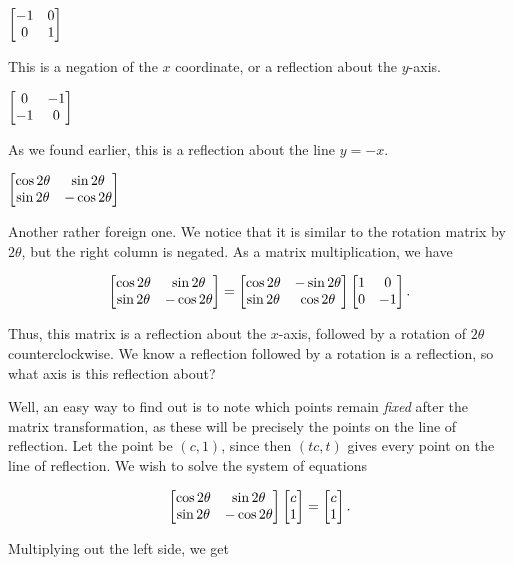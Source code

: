 \documentclass[../gatm_answers.tex]{subfiles}
\begin{document}
\begin{inner_problem}
\item $\begin{bmatrix} -1 & 0 \\ 0 & 1 \end{bmatrix}$ \label{prob:highlighted_example_list_transformations1}
\end{inner_problem}

This is a negation of the $x$ coordinate, or a reflection about the $y$-axis.

\begin{inner_problem}
\item $\begin{bmatrix} 0 & -1 \\ -1 & 0 \end{bmatrix}$ \label{prob:highlighted_example_list_transformations2}
\end{inner_problem}

As we found earlier, this is a reflection about the line $y=-x$.

\begin{inner_problem}
\item $\begin{bmatrix} \cos 2\theta & \sin 2\theta \\ \sin 2\theta & -\cos 2\theta \end{bmatrix}$ \label{prob:list_transformations_part_end}
\end{inner_problem}

Another rather foreign one. We notice that it is similar to the rotation matrix by $2\theta$, but the right column is negated. As a matrix multiplication, we have

$$\begin{bmatrix} \cos 2\theta & \sin 2\theta \\ \sin 2\theta & -\cos 2\theta \end{bmatrix} = \begin{bmatrix} \cos 2\theta & -\sin 2\theta \\ \sin 2\theta & \cos 2\theta \end{bmatrix}\begin{bmatrix} 1 & 0 \\ 0 & -1 \end{bmatrix}.$$

Thus, this matrix is a reflection about the $x$-axis, followed by a rotation of $2\theta$ counterclockwise. We know a reflection followed by a rotation is a reflection, so what axis is this reflection about?

Well, an easy way to find out is to note which points remain \textit{fixed} after the matrix transformation, as these will be precisely the points on the line of reflection. Let the point be $(c,1)$, since then $(tc,t)$ gives every point on the line of reflection. We wish to solve the system of equations

$$\begin{bmatrix} \cos 2\theta & \sin 2\theta \\ \sin 2\theta & -\cos 2\theta \end{bmatrix}\begin{bmatrix} c \\ 1 \end{bmatrix} = \begin{bmatrix} c \\ 1 \end{bmatrix}.$$

Multiplying out the left side, we get
\end{document}
